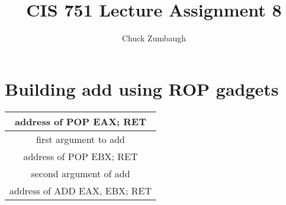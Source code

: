 \documentclass[12pt]{article}
\author{Chuck Zumbaugh}
\title{CIS 751 Lecture Assignment 8}
\begin{document}
\maketitle

\section{Building add using ROP gadgets}
\begin{tabular}{|c|}
\hline
address of POP EAX; RET \\
\hline
first argument to add \\
\hline
address of POP EBX; RET \\
\hline
second argument of add \\
\hline
address of ADD EAX, EBX; RET \\
\hline
\end{tabular}
\end{document}
